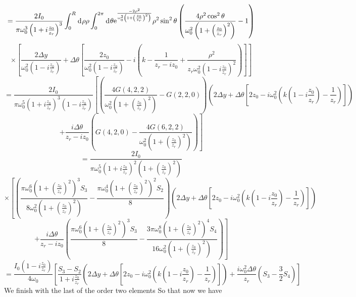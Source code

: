 \documentclass[11pt]{amsart}
\makeatletter
\newcommand{\e}{{\rm e}}				%
\newcommand{\msp}[1]{\mspace{#1mu}}		%
\newcommand{\0}{\varnothing}		%
\newcommand{\dd}{\msp{1} {\rm{d}} \msp{1}}	%
\newcommand{\1}{!}
\newcommand{\2}{@}
\newcommand{\3}{\#}
\newcommand{\4}{\$}
\newcommand{\5}{\%}
\newcommand{\6}{$^\wedge$}
\newcommand{\7}{\&}
\newcommand{\8}{*}
\newcommand{\9}{(}
\makeatother
\begin{document}
\[
=\frac{2I_0}{\pi\omega_0^3\left(1+i\frac{z_0}{z_r}\right)^3}\int_0^R \dd \rho \rho\int_0^{2\pi}\dd \theta \e^{\frac{-2\rho^2}{\omega_0^2\left(1+\left(\frac{z_0}{z_r}\right)^2\right)}}\rho^2 \sin^2 \theta\left(\frac{4\rho^2\cos^2\theta}{\omega_0^2\left(1+\left(\frac{z_0}{z_r}\right)^2\right)}-1\right)
\]
\[
 \times\left[\frac{2\Delta y}{\omega_0^2\left(1-i\frac{z_0}{z_r}\right)}+\Delta \theta\left[\frac{2z_0}{\omega_0^2\left(1-i\frac{z_0}{z_r}\right)}-i\left(k-\frac{1}{z_r-iz_0}+\frac{\rho^2}{z_r\omega_0^2\left(1-i\frac{z_0}{z_r}\right)^2}\right)\right]\right]
\]
\[
=\frac{2I_0}{\pi\omega_0^5\left(1+i\frac{z_0}{z_r}\right)^3\left(1-i\frac{z_0}{z_r}\right)}\left[\left(\frac{4G(4,2,2)}{\omega_0^2\left(1+\left(\frac{z_0}{z_r}\right)^2\right)}-G(2,2,0)\right)\left(2\Delta y + \Delta \theta\left[2z_0-i\omega_0^2\left(k\left(1-i\frac{z_0}{z_r}\right)-\frac{1}{z_r}\right)\right]\right)\right.
\]
\[
\left. + \frac{i\Delta \theta}{z_r-iz_0}\left(G(4,2,0)-\frac{4G(6,2,2)}{\omega_0^2\left(1+\left(\frac{z_0}{z_r}\right)^2\right)}\right)\right]
\]
\[
=\frac{2I_0}{\pi \omega_0^5\left(1+i\frac{z_0}{z_r}\right)^2\left(1+\left(\frac{z_0}{z_r}\right)^2\right)}
\]
\[
\times\left[\left(\frac{\pi\omega_0^6\left(1+\left(\frac{z_0}{z_r}\right)^2\right)^3S_3}{8\omega_0^2\left(1+\left(\frac{z_0}{z_r}\right)^2\right)}-\frac{\pi\omega_0^4\left(1+\left(\frac{z_0}{z_r}\right)^2\right)^2S_2}{8}\right)\left(2\Delta y + \Delta \theta\left[2z_0-i\omega_0^2\left(k\left(1-i\frac{z_0}{z_r}\right)-\frac{1}{z_r}\right)\right]\right)\right.
\]
\[
\left. + \frac{i \Delta\theta}{z_r-iz_0}\left(\frac{\pi\omega_0^6\left(1+\left(\frac{z_0}{z_r}\right)^2\right)^3S_3}{8}-\frac{3\pi\omega_0^8\left(1+\left(\frac{z_0}{z_r}\right)^2\right)^4S_4}{16\omega_0^2\left(1+\left(\frac{z_0}{z_r}\right)^2\right)}\right)\right]
\]
\[
=\frac{I_0\left(1-i\frac{z_0}{z_r}\right)}{4\omega_0}\left[\frac{S_3-S_2}{1+i\frac{z_0}{z_r}}\left(2\Delta y + \Delta \theta\left[2z_0-i\omega_0^2\left(k\left(1-i\frac{z_0}{z_r}\right)-\frac{1}{z_r}\right)\right]\right)+\frac{i\omega_0^2\Delta \theta}{z_r}\left(S_3-\frac{3}{2}S_4\right)\right]
\]
We finish with the last of the order two elements
So that now we have 
\end{document}
